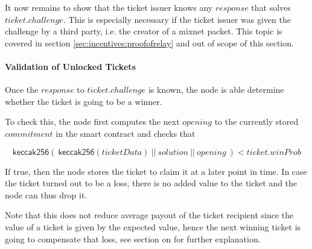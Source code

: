 It now remains to show that the ticket issuer knows any $response$ that solves $ticket.challenge$. This is especially necessary if the ticket issuer was given the challenge by a third party, i.e. the creator of a mixnet packet. This topic is covered in section \ref{sec:incentives:proofofrelay} and out of scope of this section.

\paragraph{Validation of Unlocked Tickets}
\label{sec:tickets:validation:unlocked}

Once the $response$ to $ticket.challenge$ is known, the node is able determine whether the ticket is going to be a winner.

To check this, the node first computes the next $opening$ to the currently stored $commitment$ in the smart contract and checks that

$$ \mathsf{keccak256} ( \ \mathsf{keccak256}(ticketData) \ || \ solution \ || \ opening \ ) < ticket.winProb $$

If true, then the node stores the ticket to claim it at a later point in time. In case the ticket turned out to be a loss, there is no added value to the ticket and the node can thus drop it.

Note that this does not reduce average payout of the ticket recipient since the value of a ticket is given by the expected value, hence the next winning ticket is going to compensate that loss, see section on  for further explanation.